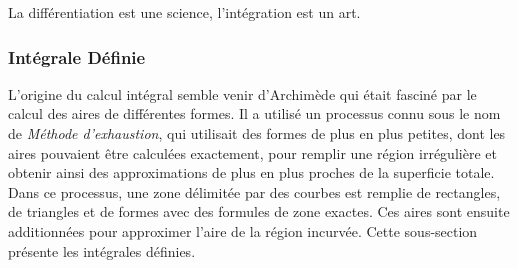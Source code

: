 		 \begin{fquote}[Anonymous]La différentiation est une science, l'intégration est un art.
 		\end{fquote}
		 
		 \subsubsection{Intégrale Définie}\label{definite integral}
		 L'origine du calcul intégral semble venir d'Archimède qui était fasciné par le calcul des aires de différentes formes. Il a utilisé un processus connu sous le nom de \textit{Méthode d'exhaustion}, qui utilisait des formes de plus en plus petites, dont les aires pouvaient être calculées exactement, pour remplir une région irrégulière et obtenir ainsi des approximations de plus en plus proches de la superficie totale. Dans ce processus, une zone délimitée par des courbes est remplie de rectangles, de triangles et de formes avec des formules de zone exactes. Ces aires sont ensuite additionnées pour approximer l'aire de la région incurvée. Cette sous-section présente les intégrales définies.
		 		 
